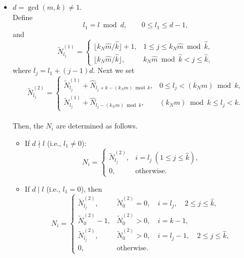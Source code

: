 \documentclass[preprint,3p,10pt]{elsarticle}
\theoremstyle{definition}
\begin{document}
\begin{itemize}
\item[{Case $2$:}] 
{
\(d=\gcd(m,k) \neq 1\). \\
Define
\[
l_1=l\bmod d,\qquad 0\leq l_1\leq d-1,
\]
and
\[
\tilde{N}_{l_j}^{(1)} = 
\begin{cases}
\lfloor k_N \widehat{m} / \widehat{k} \rfloor + 1, & 1 \leq j \leq k_N \widehat{m} \bmod{\widehat{k}}, \\
\lfloor k_N \widehat{m} / \widehat{k} \rfloor, & k_N \widehat{m} \bmod \widehat{k} < j \leq \widehat{k},
\end{cases}
\]
where \(l_j = l_1 + (j-1)d\).
Next we set
\[
\tilde{N}_{l_j}^{(2)} = 
\begin{cases}
\tilde{N}_{l_j}^{(1)} + \hat{N}_{l_j + k - (k_N m) \bmod k}, & 0 \leq l_j < (k_N m) \bmod k,\\
\tilde{N}_{l_j}^{(1)} + \hat{N}_{l_j - (k_N m) \bmod k}, & (k_N m) \bmod k \leq l_j < k.
\end{cases}
\]\\
Then, the \(N_i\) are determined as follows.
\begin{itemize}
     \item If \(d \nmid l\) (i.e., \(l_1 \neq 0\)):
\[
N_i = 
\begin{cases}
\tilde{N}_{l_j}^{(2)}, & i = l_j \ (1 \leq j \leq \widehat{k}), \\
0, & \text{otherwise}.
\end{cases}
\]

\item If \(d\mid l\) (i.e., \(l_1=0\)), then
\[
N_i=
\begin{cases}
\tilde{N}_{l_j}^{(2)},
& \tilde{N}_0^{(2)}=0,\quad
  i=l_j,\quad 2\leq j\leq\widehat{k},\\
\tilde{N}_0^{(2)}-1,
& \tilde{N}_0^{(2)}>0,\quad i=k-1,\\
\tilde{N}_{l_j}^{(2)},
& \tilde{N}_0^{(2)}>0,\quad
  i=l_j-1,\quad 2\leq j\leq\widehat{k},\\
0,
& \text{otherwise}.
\end{cases}
\]
\end{itemize}
}
\end{itemize}
\end{document}
